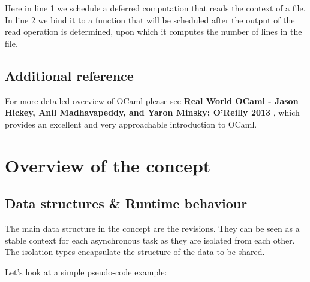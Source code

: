 \documentclass[12pt,twoside,notitlepage]{report}
\begin{document}
Here in line 1 we schedule a deferred computation that reads the context of a file. In line 2 we bind it to a function that will be scheduled after the output of the read operation is determined, upon which it computes the number of lines in the file.


\subsection{Additional reference}
For more detailed overview of OCaml please see {\bf Real World OCaml -  Jason Hickey, Anil Madhavapeddy, and Yaron Minsky; O'Reilly 2013} \cite{realocaml}, which provides an excellent and very approachable introduction to OCaml.

\section{Overview of the concept}


\subsection{Data structures \& Runtime behaviour }
\label{rev_data_struct}
\label{example}
The main data structure in the concept are the revisions. They can be seen as a stable context for each asynchronous task as they are isolated from each other. The isolation types encapsulate the structure of the data to be shared. 

Let's look at a simple pseudo-code example:

  
  
  
  
\end{document}
